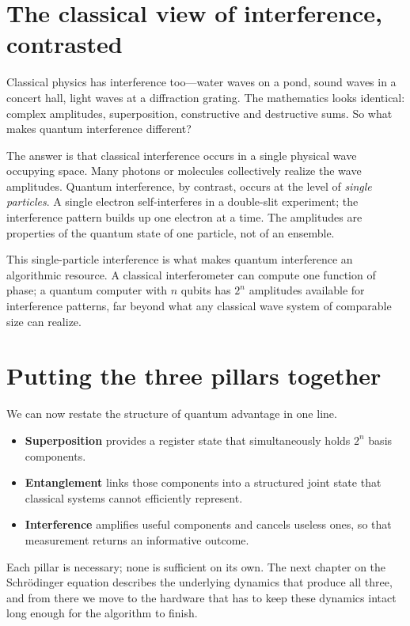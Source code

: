 \section{The classical view of interference, contrasted}

Classical physics has interference too---water waves on a pond, sound waves in a concert hall, light waves at a diffraction grating. The mathematics looks identical: complex amplitudes, superposition, constructive and destructive sums. So what makes quantum interference different?

The answer is that classical interference occurs in a single physical wave occupying space. Many photons or molecules collectively realize the wave amplitudes. Quantum interference, by contrast, occurs at the level of \emph{single particles}. A single electron self-interferes in a double-slit experiment; the interference pattern builds up one electron at a time. The amplitudes are properties of the quantum state of one particle, not of an ensemble.

This single-particle interference is what makes quantum interference an algorithmic resource. A classical interferometer can compute one function of phase; a quantum computer with $n$ qubits has $2^n$ amplitudes available for interference patterns, far beyond what any classical wave system of comparable size can realize.

\section{Putting the three pillars together}

We can now restate the structure of quantum advantage in one line.

\begin{itemize}
  \item \textbf{Superposition} provides a register state that simultaneously holds $2^n$ basis components.
  \item \textbf{Entanglement} links those components into a structured joint state that classical systems cannot efficiently represent.
  \item \textbf{Interference} amplifies useful components and cancels useless ones, so that measurement returns an informative outcome.
\end{itemize}

Each pillar is necessary; none is sufficient on its own. The next chapter on the Schr\"odinger equation describes the underlying dynamics that produce all three, and from there we move to the hardware that has to keep these dynamics intact long enough for the algorithm to finish.

\textsep
